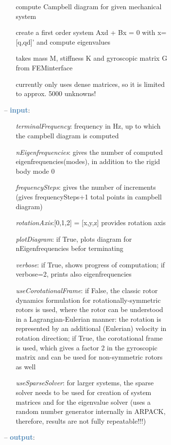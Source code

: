 \begin{itemize}[leftmargin=1.4cm]
\begin{itemize}[leftmargin=1.4cm]
\begin{itemize}[leftmargin=0.5cm]
\begin{itemize}[leftmargin=1.4cm]
\begin{itemize}[leftmargin=1.4cm]
\begin{itemize}[leftmargin=0.5cm]
\begin{itemize}[leftmargin=0.7cm]
\begin{itemize}[leftmargin=1.2cm]
\setlength{\itemindent}{-0.7cm}
    \item[] compute Campbell diagram for given mechanical system
    \item[] create a first order system Axd + Bx = 0 with x= [q,qd]' and compute eigenvalues
    \item[] takes mass M, stiffness K and gyroscopic matrix G from FEMinterface
    \item[] currently only uses dense matrices, so it is limited to approx. 5000 unknowns!
  \end{itemize}
  \item[--]  \textcolor{steelblue}{\bf input}: \vspace{-6pt}
  \begin{itemize}[leftmargin=1.2cm]
\setlength{\itemindent}{-0.7cm}
    \item[] {\it terminalFrequency}: frequency in Hz, up to which the campbell diagram is computed
    \item[] {\it   nEigenfrequencies}: gives the number of computed eigenfrequencies(modes), in addition to the rigid body mode 0
    \item[] {\it   frequencySteps}: gives the number of increments (gives frequencySteps+1 total points in campbell diagram)
    \item[] {\it   rotationAxis}:[0,1,2] = [x,y,z] provides rotation axis
    \item[] {\it   plotDiagram}: if True, plots diagram for nEigenfrequencies befor terminating
    \item[] {\it   verbose}: if True, shows progress of computation; if verbose=2, prints also eigenfrequencies
    \item[] {\it   useCorotationalFrame}: if False, the classic rotor dynamics formulation for rotationally-symmetric rotors is used, where the rotor can be understood in a Lagrangian-Eulerian manner: the rotation is represented by an additional (Eulerian) velocity in rotation direction; if True, the corotational frame is used, which gives a factor 2 in the gyroscopic matrix and can be used for non-symmetric rotors as well
    \item[] {\it   useSparseSolver}: for larger systems, the sparse solver needs to be used for creation of system matrices and for the eigenvalue solver (uses a random number generator internally in ARPACK, therefore, results are not fully repeatable!!!)
  \end{itemize}
  \item[--]  \textcolor{steelblue}{\bf output}: \vspace{-6pt}

\end{itemize}
\end{itemize}
\end{itemize}
\end{itemize}
\end{itemize}
\end{itemize}
\end{itemize}
